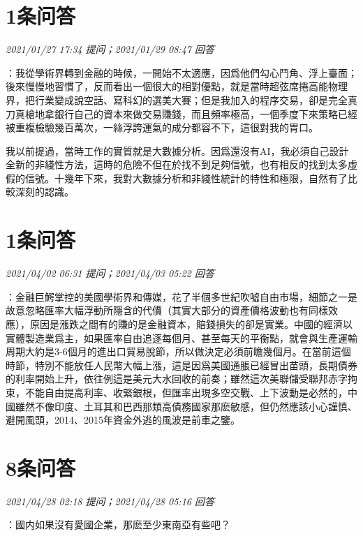 \documentclass[twocolumn]{ctexart}
\begin{document}
\section{1条问答}

\textit{\hfill\noindent\small 2021/01/27 17:34 提问；2021/01/29 08:47 回答}

：我從學術界轉到金融的時候，一開始不太適應，因爲他們勾心鬥角、浮上臺面；後來慢慢地習慣了，反而看出一個很大的相對優點，就是當時超弦席捲高能物理界，把行業變成說空話、寫科幻的選美大賽；但是我加入的程序交易，卻是完全真刀真槍地拿銀行自己的資本來做交易賺錢，而且頻率極高，一個季度下來策略已經被重複檢驗幾百萬次，一絲浮誇運氣的成分都容不下，這很對我的胃口。

我以前提過，當時工作的實質就是大數據分析。因爲還沒有AI，我必須自己設計全新的非綫性方法，這時的危險不但在於找不到足夠信號，也有相反的找到太多虛假的信號。十幾年下來，我對大數據分析和非綫性統計的特性和極限，自然有了比較深刻的認識。
\\

\section{1条问答}

\textit{\hfill\noindent\small 2021/04/02 06:31 提问；2021/04/03 05:22 回答}

：金融巨鰐掌控的美國學術界和傳媒，花了半個多世紀吹噓自由市場，細節之一是故意忽略匯率大幅浮動所隱含的代價（其實大部分的資產價格波動也有同樣效應），原因是漲跌之間有的賺的是金融資本，賠錢損失的卻是實業。中國的經濟以實體製造業爲主，如果匯率自由追逐每個月、甚至每天的平衡點，就會與生產運輸周期大約是3-6個月的進出口貿易脫節，所以做決定必須前瞻幾個月。在當前這個時節，特別不能放任人民幣大幅上漲，這是因爲美國通脹已經冒出苗頭，長期債券的利率開始上升，依往例這是美元大水回收的前奏；雖然這次美聯儲受聯邦赤字拘束，不能自由提高利率、收緊銀根，但匯率出現多空交戰、上下波動是必然的，中國雖然不像印度、土耳其和巴西那類高債務國家那麽敏感，但仍然應該小心謹慎、避開風頭，2014、2015年資金外逃的風波是前車之鑒。
\\

\section{8条问答}

\textit{\hfill\noindent\small 2021/04/28 02:18 提问；2021/04/28 05:16 回答}

：國内如果沒有愛國企業，那麽至少東南亞有些吧？
\end{document}
